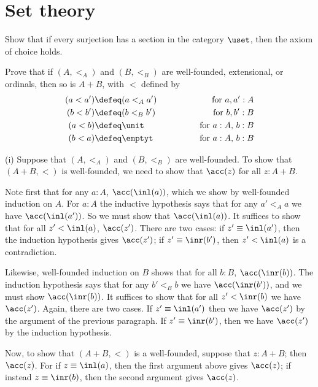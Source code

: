 \begin{coqdoccode}
\end{coqdoccode}
\section{Set theory}




Show that if every surjection has a section in the category $\uset$, then the
axiom of choice holds.



Prove that if $(A, <_{A})$ and $(B, <_{B})$ are well-founded, extensional,
or ordinals, then so is $A + B$, with $<$ defined by
\begin{alignat*}{3}
  (a < a') &\defeq (a <_{A} a') &\qquad\qquad \text{for $a, a' : A$} \\
  (b < b') &\defeq (b <_{B} b') &\qquad\qquad \text{for $b, b' : B$} \\
  (a < b) &\defeq \unit &\qquad\qquad \text{for $a: A$, $b : B$} \\
  (b < a) &\defeq \emptyt &\qquad\qquad \text{for $a : A$, $b : B$}
\end{alignat*}


 \soln
(i)
Suppose that $(A, <_{A})$ and $(B, <_{B})$ are well-founded.  To show that $(A
+ B, <)$ is well-founded, we need to show that $\acc(z)$ for all $z : A+B$.


Note first that for any $a : A$, $\acc(\inl(a))$, which we show by well-founded
induction on $A$.  For $a : A$ the inductive hypothesis says that for any $a'
<_{A} a$ we have $\acc(\inl(a'))$. So we must show that $\acc(\inl(a))$.  It
suffices to show that for all $z' < \inl(a)$, $\acc(z')$.  There are two cases:
if $z' \equiv \inl(a')$, then the induction hypothesis gives $\acc(z')$; if $z'
\equiv \inr(b')$, then $z' < \inl(a)$ is a contradiction.


Likewise, well-founded induction on $B$ shows that for all $b : B$,
$\acc(\inr(b))$.  The induction hypothesis says that for any $b' <_{B} b$ we
have $\acc(\inr(b'))$, and we must show $\acc(\inr(b))$.  It suffices to show
that for all $z' < \inr(b)$ we have $\acc(z')$.  Again, there are two cases.
If $z' \equiv \inl(a')$ then we have $\acc(z')$ by the argument of the previous
paragraph.  If $z' \equiv \inr(b')$, then we have $\acc(z')$ by the induction
hypothesis.


Now, to show that $(A + B, <)$ is a well-founded, suppose that $z : A + B$;
then $\acc(z)$.  For if $z \equiv \inl(a)$, then the first argument above gives
$\acc(z)$; if instead $z \equiv \inr(b)$, then the second argument gives
$\acc(z)$.


